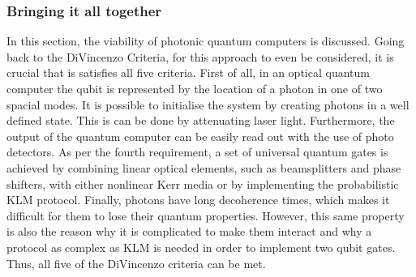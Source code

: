 \subsubsection{Bringing it all together}
In this section, the viability of photonic quantum computers is discussed. Going back to the DiVincenzo Criteria, for this approach to even be considered, it is crucial that is satisfies all five criteria. First of all, in an optical quantum computer the qubit is represented by the location of a photon in one of two spacial modes. It is possible to initialise the system by creating photons in a well defined state. This is can be done by attenuating laser light. Furthermore, the output of the quantum computer can be easily read out with the use of photo detectors. As per the fourth requirement, a set of universal quantum gates is achieved by combining linear optical elements, such as beamsplitters and phase shifters, with either nonlinear Kerr media or by implementing the probabilistic KLM protocol. Finally, photons have long decoherence times, which makes it difficult for them to lose their quantum properties. However, this same property is also the reason why it is complicated to make them interact and why a protocol as complex as KLM is needed in order to implement two qubit gates. Thus, all five of the DiVincenzo criteria can be met. 

